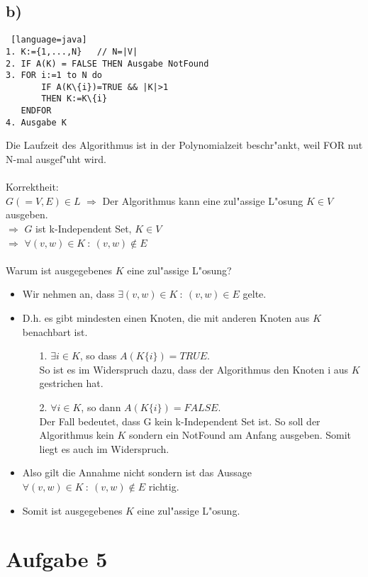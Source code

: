 \documentclass[a4paper,11pt]{scrartcl}
\begin{document}
\subsection*{b)}
\begin{lstlisting} [language=java]
1. K:={1,...,N}   // N=|V|
2. IF A(K) = FALSE THEN Ausgabe NotFound 
3. FOR i:=1 to N do
       IF A(K\{i})=TRUE && |K|>1
       THEN K:=K\{i}
   ENDFOR
4. Ausgabe K	
\end{lstlisting}
Die Laufzeit des Algorithmus ist in der Polynomialzeit beschr"ankt, weil FOR nut N-mal ausgef"uht wird.
\\ \ \\
Korrektheit:\\
$G(=V,E)\in L$ $\Longrightarrow$ Der Algorithmus kann eine zul"assige L"osung $K\in V$ ausgeben.\\
$\Longrightarrow$ $G$ ist k-Independent Set, $K\in V$\\
$\Longrightarrow$ $\forall (v,w)\in K\ :\ (v,w)\notin E$
\\ \ \\
Warum ist ausgegebenes $K$ eine zul"assige L"osung?
\begin{itemize}
	\item Wir nehmen an, dass $\exists (v,w)\in K\ :\ (v,w)\in E$ gelte.
	\item D.h. es gibt mindesten einen Knoten, die mit anderen Knoten aus $K$ benachbart ist.
		\begin{itemize}
			\item[1.] $\exists i \in K$, so dass $A(K\{i\})=TRUE$.\\
			So ist es im Widerspruch dazu, dass der Algorithmus den Knoten i aus $K$ gestrichen hat.
			\item[2.] $\forall i \in K$, so dann $A(K\{i\})=FALSE$.\\
			Der Fall bedeutet, dass G kein k-Independent Set ist. So soll der Algorithmus kein $K$ sondern ein NotFound am Anfang ausgeben. Somit liegt es auch im Widerspruch.
		\end{itemize}
	\item Also gilt die Annahme nicht sondern ist das Aussage $\forall (v,w)\in K\ :\ (v,w)\notin E$ richtig.
	\item Somit ist ausgegebenes $K$ eine zul"assige L"osung.
\end{itemize}

\section*{Aufgabe 5}
\end{document}
